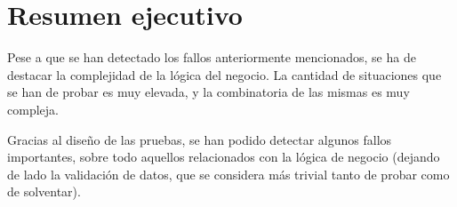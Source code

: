 \chapter{Resumen ejecutivo}
Pese a que se han detectado los fallos anteriormente mencionados, se ha de destacar la complejidad
de la lógica del negocio. La cantidad de situaciones que se han de probar es muy elevada, y la
combinatoria de las mismas es muy compleja.

Gracias al diseño de las pruebas, se han podido detectar algunos fallos importantes, sobre todo aquellos
relacionados con la lógica de negocio (dejando de lado la validación de datos, que se considera más trivial
tanto de probar como de solventar).
